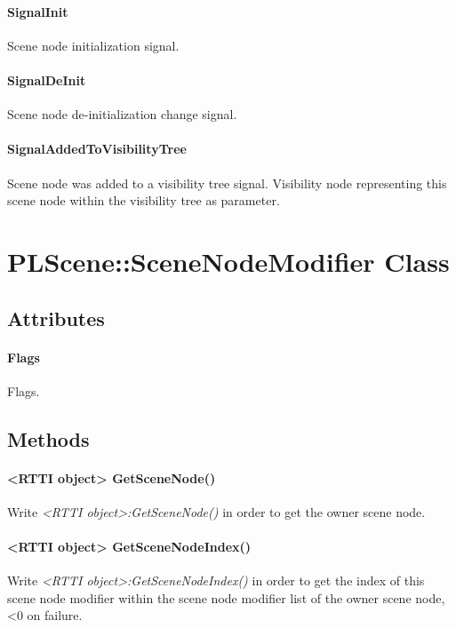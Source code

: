 \paragraph{SignalInit}
Scene node initialization signal.

\paragraph{SignalDeInit}
Scene node de-initialization change signal.

\paragraph{SignalAddedToVisibilityTree}
Scene node was added to a visibility tree signal. Visibility node representing this scene node within the visibility tree as parameter.




\section{PLScene::SceneNodeModifier Class}


\subsection{Attributes}

\paragraph{Flags}
Flags.


\subsection{Methods}

\paragraph{<RTTI object> GetSceneNode()}
Write \emph{<RTTI object>:GetSceneNode()} in order to get the owner scene node.

\paragraph{<RTTI object> GetSceneNodeIndex()}
Write \emph{<RTTI object>:GetSceneNodeIndex()} in order to get the index of this scene node modifier within the scene node modifier list of the owner scene node, <0 on failure.

